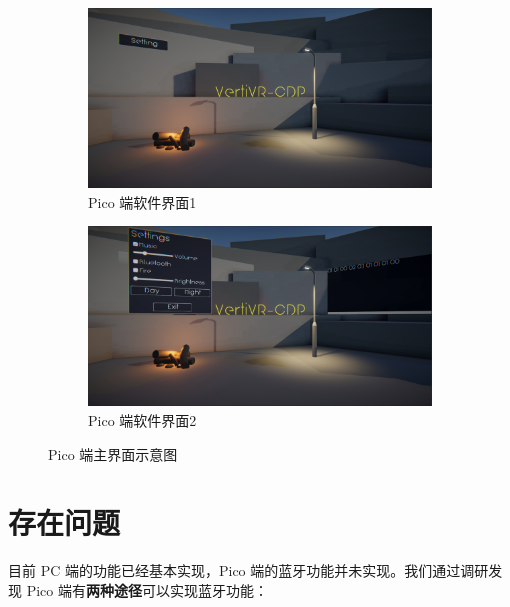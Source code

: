 \documentclass[a4paper,10pt]{article}
\begin{document}
		\begin{figure}[htbp] 
			\centering 
			\begin{subfigure}{0.49\textwidth}
				\includegraphics[width=\linewidth]{picture/Pico UI 1}
				\captionsetup{font=scriptsize}
				\caption{Pico 端软件界面1}
				\label{fig:pico-ui-1}
			\end{subfigure}
			\begin{subfigure}{0.49\textwidth}
				\includegraphics[width=\linewidth]{picture/Pico UI 2}
				\captionsetup{font=scriptsize}
				\caption{Pico 端软件界面2}
				\label{fig:pico-ui-2}
			\end{subfigure}
			\caption{
				\label{fig: Pico Main menu}	
				Pico 端主界面示意图				
			}
		\end{figure}
	
		\section{存在问题}
		
		目前 PC 端的功能已经基本实现，Pico 端的蓝牙功能并未实现。我们通过调研发现 Pico 端有\textbf{两种途径}可以实现蓝牙功能：
		
\end{document}
